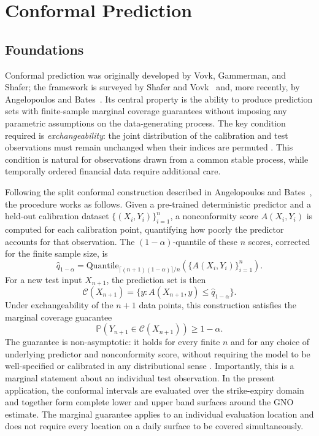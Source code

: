 \section{Conformal Prediction}
\label{sec:conformal_background}

\subsection{Foundations}
\label{subsec:cp_foundations}

Conformal prediction was originally developed by Vovk, Gammerman, and Shafer; the framework is surveyed by Shafer and Vovk~\cite{shafer2008tutorial} and, more recently, by Angelopoulos and Bates~\cite{angelopoulos2023gentle}. Its central property is the ability to produce prediction sets with finite-sample marginal coverage guarantees without imposing any parametric assumptions on the data-generating process. The key condition required is \emph{exchangeability}: the joint distribution of the calibration and test observations must remain unchanged when their indices are permuted \cite{angelopoulos2023gentle}. This condition is natural for observations drawn from a common stable process, while temporally ordered financial data require additional care.

Following the split conformal construction described in Angelopoulos and Bates~\cite{angelopoulos2023gentle}, the procedure works as follows. Given a pre-trained deterministic predictor and a held-out calibration dataset $\{(X_i,Y_i)\}_{i=1}^{n}$, a nonconformity score $A(X_i,Y_i)$ is computed for each calibration point, quantifying how poorly the predictor accounts for that observation. The $(1-\alpha)$-quantile of these $n$ scores, corrected for the finite sample size, is
\begin{equation}
    \hat{q}_{1-\alpha} = \mathrm{Quantile}_{\lceil(n+1)(1-\alpha)\rceil/n}\!\left(\{A(X_i,Y_i)\}_{i=1}^{n}\right).
\end{equation}
For a new test input $X_{n+1}$, the prediction set is then
\begin{equation}
    \mathcal{C}(X_{n+1})
    =
    \{y : A(X_{n+1},y) \leq \hat{q}_{1-\alpha}\}.
\end{equation}
Under exchangeability of the $n+1$ data points, this construction satisfies the marginal coverage guarantee
\begin{equation}
    \mathbb{P}\left(
    Y_{n+1} \in \mathcal{C}(X_{n+1})
    \right)
    \geq 1-\alpha.
\end{equation}
The guarantee is non-asymptotic: it holds for every finite $n$ and for any choice of underlying predictor and nonconformity score, without requiring the model to be well-specified or calibrated in any distributional sense \cite{shafer2008tutorial, angelopoulos2023gentle}. Importantly, this is a marginal statement about an individual test observation. In the present application, the conformal intervals are evaluated over the strike-expiry domain and together form complete lower and upper band surfaces around the GNO estimate. The marginal guarantee applies to an individual evaluation location and does not require every location on a daily surface to be covered simultaneously.

